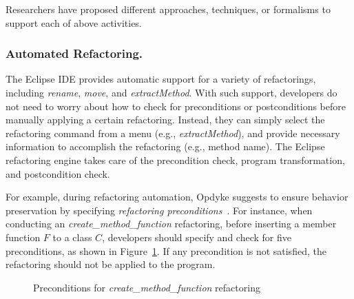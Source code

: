 \documentclass[runningheads,a4paper]{llncs}
\begin{document}
Researchers have proposed different approaches, techniques, or formalisms to support each of above activities.

\subsubsection{Automated Refactoring.} 

The Eclipse IDE provides automatic support for a variety of refactorings, including \emph{rename}, \emph{move}, and \emph{extractMethod}. With such support, developers do not need to worry about how to check for preconditions or postconditions before manually applying a certain refactoring. Instead, they can simply select the refactoring command from a menu (e.g., \emph{extractMethod}), and provide necessary information to accomplish the refactoring (e.g., method name). The Eclipse refactoring engine takes care of the precondition check, program transformation, and postcondition check. 

For example, during refactoring automation, Opdyke suggests to ensure behavior preservation by specifying \emph{refactoring preconditions}~\cite{Opdyke1992:ROF}. For instance, when conducting an \emph{create\_method\_function} refactoring, before inserting a member function $F$ to a class $C$, developers should specify and check for five preconditions, as shown in Figure~\ref{fig:preconditions}. If any precondition is not satisfied, the refactoring should not be applied to the program.

\begin{figure}[!htb]
\centering
{}
\caption{Preconditions for \emph{create\_method\_function} refactoring~\cite{Opdyke1992:ROF}}
\label{fig:preconditions}
\end{figure}
\end{document}
